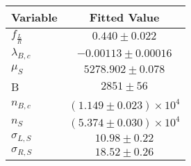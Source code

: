 \begin{tabular}[t]{lc}
\hline
Variable &Fitted Value\\
\hline\hline
$f_{\frac{L}{R}}$&$0.440\pm0.022$\\
\hline
$\lambda_{B,c}$&$-0.00113\pm0.00016$\\
\hline
$\mu_S$&$5278.902\pm0.078$\\
\hline
B&$2851\pm56$\\
\hline
$n_{B,c}$&$(1.149\pm0.023)\times 10^4$\\
\hline
$n_S$&$(5.374\pm0.030)\times 10^4$\\
\hline
$\sigma_{L, S}$&$10.98\pm0.22$\\
\hline
$\sigma_{R, S}$&$18.52\pm0.26$\\
\hline
\end{tabular}